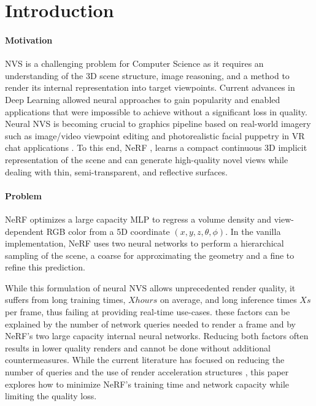 \glsresetall
\section{Introduction}

\paragraph{Motivation}
\gls{NVS} is a challenging problem for Computer Science as it requires an understanding of the 3D scene structure, image reasoning, and a method to render its internal representation into target viewpoints. Current advances in Deep Learning allowed neural approaches to gain popularity and enabled applications that were impossible to achieve without a significant loss in quality. Neural \gls{NVS} is becoming crucial to graphics pipeline based on real-world imagery such as image/video viewpoint editing  and photorealistic facial puppetry in \gls{VR} chat applications . To this end, \gls{NeRF} , learns a compact continuous 3D implicit representation of the scene and can generate high-quality novel views while dealing with thin, semi-transparent, and reflective surfaces.

\paragraph{Problem}
\gls{NeRF} optimizes a large capacity \gls{MLP} to regress a volume density and view-dependent RGB color from a 5D coordinate $(x,y, z,\theta,\phi)$. In the vanilla implementation, \gls{NeRF} uses two neural networks to perform a hierarchical sampling of the scene, a coarse for approximating the geometry and a fine to refine this prediction.

While this formulation of neural \gls{NVS} allows unprecedented render quality, it suffers from long training times, $X hours$ on average, and long inference times $X s$ per frame, thus failing at providing real-time use-cases. these factors can be explained by the number of network queries needed to render a frame and by \gls{NeRF}'s two large capacity internal neural networks. Reducing both factors often results in lower quality renders and cannot be done without additional countermeasures. While the current literature has focused on reducing the number of queries  and the use of render acceleration structures , this paper explores how to minimize \gls{NeRF}'s training time and network capacity while limiting the quality loss.

